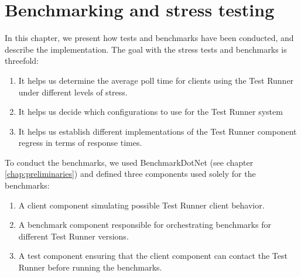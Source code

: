 \section{Benchmarking and stress testing} \label{chap:Benchmarking}
In this chapter, we present how tests and benchmarks have been conducted, and describe the implementation. 
The goal with the stress tests and benchmarks is threefold: 
\begin{enumerate}
\item It helps us determine the average poll time for clients using the Test Runner under different levels of stress.
\item It helps us decide which configurations to use for the Test Runner system
\item It helps us establish different implementations of the Test Runner component regress in terms of response times.
\end{enumerate}
To conduct the benchmarks, we used BenchmarkDotNet (see chapter \ref{chap:preliminaries}) and defined three components used solely for the benchmarks:
\begin{enumerate}
  \item A client component simulating possible Test Runner client behavior.
  \item A benchmark component responsible for orchestrating benchmarks for different Test Runner versions.
  \item A test component ensuring that the client component can contact the Test Runner before running the benchmarks.
\end{enumerate}


